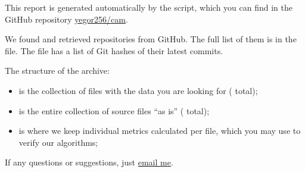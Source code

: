 \documentclass[nobrand,anonymous,nosecurity]{huawei}
\begin{document}
\maketitle

This report is generated automatically by the script, which you can find in
the GitHub repository \href{https://github.com/yegor256/cam}{yegor256/cam}.

We found and retrieved 
repositories from GitHub.
The full list of them is in the  file.
The  file has a list of Git hashes of their latest commits.


The structure of the archive:

\begin{itemize}
  \item {} is the collection of  files with the data
  you are looking for ( total);

  \item {} is the entire collection of
  source files ``as is''
  ( total);

  \item {} is where we keep individual metrics calculated
  per file, which you may use to verify our algorithms;
\end{itemize}

If any questions or suggestions, just \href{mailto:yegor256@gmail.com}{email me}.
\end{document}
